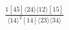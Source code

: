 \documentclass[varwidth, border=5pt]{standalone}
\begin{document}
\begin{my}
$\begin{gathered}
\scriptscriptstyle\frac{1[45]⟨24⟩⟨12⟩[15]}{⟨14⟩^2[14]⟨23⟩⟨34⟩}
\end{gathered}$
\end{my}
\end{document}
